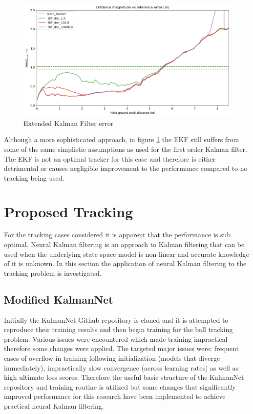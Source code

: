 \documentclass[a4paper,twoside,12pt]{report}
\begin{document}
\begin{figure}[h!]
\begin{center}
\includegraphics[width=12cm]{images/ekf_error.png}
\caption{Extended Kalman Filter error}
\label{fig:ekferror}
\end{center}
\end{figure}

Although a more sophisticated approach, in figure \ref{fig:ekferror} the EKF still suffers from some of the same simplistic assumptions as used for the first order Kalman filter. The EKF is not an optimal tracker for this case and therefore is either detrimental or causes negligible improvement to the performance compared to no tracking being used.

\newpage
\section{Proposed Tracking}

For the tracking cases considered it is apparent that the performance is sub optimal. Neural Kalman filtering is an approach to Kalman filtering that can be used when the underlying state space model is non-linear and accurate knowledge of it is unknown. In this section the application of neural Kalman filtering to the tracking problem is investigated.

\subsection{Modified KalmanNet}

Initially the KalmanNet Github repository \cite{kalmangit} is cloned and it is attempted to reproduce their training results and then begin training for the ball tracking problem. Various issues were encountered which made training impractical therefore some changes were applied. The targeted major issues were: frequent cases of overflow in training following initialization (models that diverge immediately), impractically slow convergence (across learning rates) as well as high ultimate loss scores. Therefore the useful basic structure of the KalmanNet repository and training routine is utilized but some changes that significantly improved performance for this research have been implemented to achieve practical neural Kalman filtering. 
\end{document}
